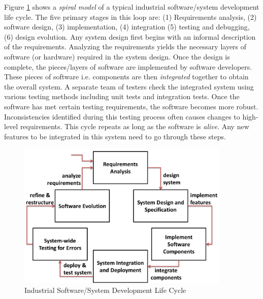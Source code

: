 Figure \ref{fig:sdlc} shows a \emph{spiral model} \cite{boehm1988spiral} of a typical industrial software/system development life cycle.  The five primary stages in this loop are: (1) Requirements analysis, (2) software design, (3) implementation, (4) integration (5) testing and debugging, (6) design evolution. Any system design first begins with an informal description of the requirements. Analyzing the requirements yields the necessary layers of software (or hardware) required in the system design. Once the design is complete, the pieces/layers of software are implemented by software developers. These pieces of software i.e. components are then \emph{integrated} together to obtain the overall system.  A separate team of testers check the integrated system using various testing methods including unit tests and integration tests. Once the software has met certain testing requirements, the software becomes more robust. Inconsistencies identified during this testing process often causes changes to high-level requirements. This cycle repeats as long as the software is \emph{alive}. Any new features to be integrated in this system need to go through these steps. 

\begin{figure}[h]
	\centering
	\includegraphics[width=0.9\textwidth]{./figs/sdlc}
	\caption{Industrial Software/System Development Life Cycle}
	\label{fig:sdlc}
\end{figure}

